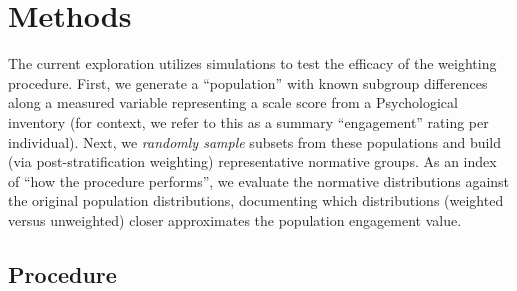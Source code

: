 \documentclass[
  ,man]{apa7}
\begin{document}
\hypertarget{methods}{%
\section{Methods}\label{methods}}

The current exploration utilizes simulations to test the efficacy of the weighting procedure. First, we generate a ``population'' with known subgroup differences along a measured variable representing a scale score from a Psychological inventory (for context, we refer to this as a summary ``engagement'' rating per individual). Next, we \emph{randomly sample} subsets from these populations and build (via post-stratification weighting) representative normative groups. As an index of ``how the procedure performs'', we evaluate the normative distributions against the original population distributions, documenting which distributions (weighted versus unweighted) closer approximates the population engagement value.

\hypertarget{procedure}{%
\subsection{Procedure}\label{procedure}}
\end{document}

